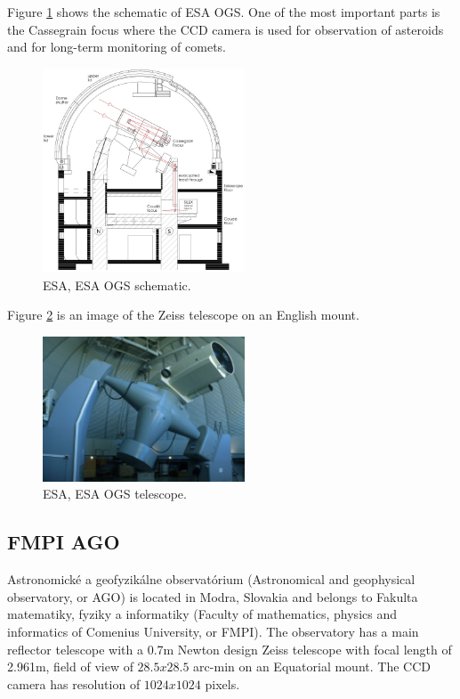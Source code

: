 	Figure \ref{fig:esaogs1} shows the schematic of ESA OGS. One of the most important parts is the Cassegrain focus where the CCD camera is used for observation of asteroids and for long-term monitoring of comets.


\begin{figure}[H]
\centering
  \includegraphics[width=6cm]{images/ESAOGS1}
  \caption{ESA, ESA OGS schematic.}
  \label{fig:esaogs1}
\end{figure}

	Figure \ref{fig:esaogs2} is an image of the Zeiss telescope on an English mount.

\begin{figure}[H]
\centering
  \includegraphics[width=6cm]{images/ESAOGS2}
  \caption{ESA, ESA OGS telescope.}
  \label{fig:esaogs2}
\end{figure}

\subsection{FMPI AGO}\label{subsec:fmpi_ago}
Astronomické a geofyzikálne observatórium (Astronomical and geophysical observatory, or AGO) is located in Modra, Slovakia and belongs to Fakulta matematiky, fyziky a informatiky (Faculty of mathematics, physics and informatics of Comenius University, or FMPI). The observatory has a main reflector telescope with a 0.7m Newton design Zeiss telescope with focal length of 2.961m, field of view of $28.5 x 28.5$ arc-min on an Equatorial mount. The CCD camera has resolution of $1024 x 1024$ pixels.

